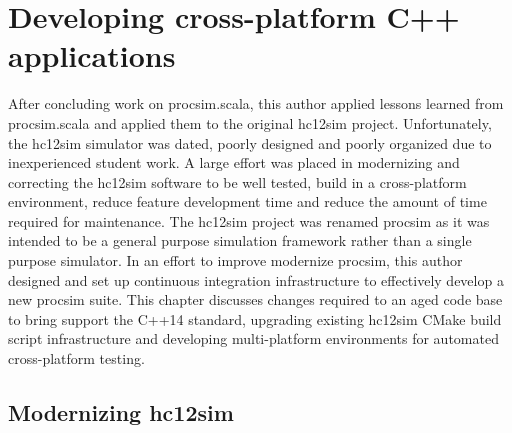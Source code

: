 \chapter{Developing cross-platform C++ applications}
\label{ch:cross-platform}


\newcommand{\cmakeinline}[1]{\texttt{#1}}
    
After concluding work on procsim.scala, this author applied lessons learned from procsim.scala and applied them to the original hc12sim project. Unfortunately, the hc12sim simulator was dated, poorly designed and poorly organized due to inexperienced student work. A large effort was placed in modernizing and correcting the hc12sim software to be well tested, build in a cross-platform environment, reduce feature development time and reduce the amount of time required for maintenance. The hc12sim project was renamed procsim as it was intended to be a general purpose simulation framework rather than a single purpose \hcmodel{} simulator. In an effort to improve modernize procsim, this author designed and set up continuous integration infrastructure to effectively develop a new procsim suite. This chapter discusses changes required to an aged code base to bring support the C++14 standard, upgrading existing hc12sim CMake \cite{Kitware:CMake} build script infrastructure and developing multi-platform environments for automated cross-platform testing.

\section{Modernizing hc12sim}
\label{sec:cross-platform:sec:modernizing}

